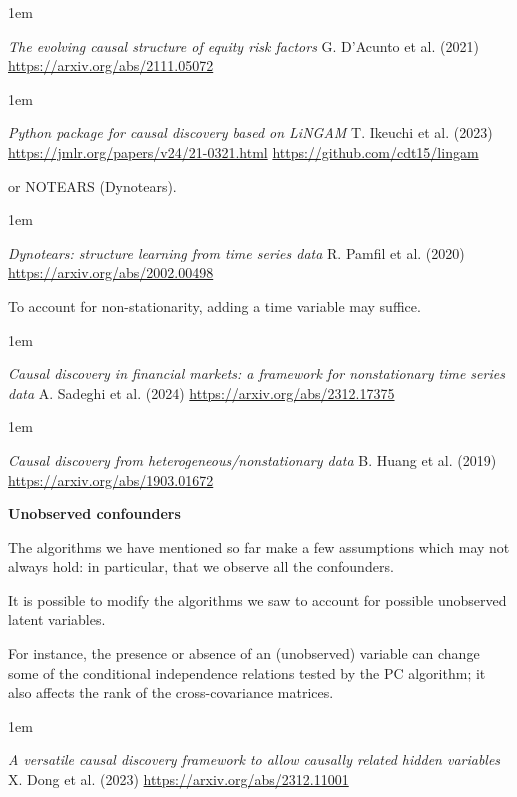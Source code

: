 \documentclass[a5paper]{article}
\newenvironment{reference}{%
  \medskip\goodbreak
  \parskip 0pt
  \raggedright
  \leftskip 1em
  \obeylines
}{\par\medskip\goodbreak}
\def\subsection#1{{\par\bigskip\goodbreak\large\bfseries #1\par}}
\begin{document}
\begin{reference}
  \emph{The evolving causal structure of equity risk factors}
  G. D'Acunto et al. (2021)
  \url{https://arxiv.org/abs/2111.05072}
\end{reference}

\begin{reference}
  \emph{Python package for causal discovery based on LiNGAM}
  T. Ikeuchi et al. (2023)
  \url{https://jmlr.org/papers/v24/21-0321.html}
  \url{https://github.com/cdt15/lingam}
\end{reference}

or NOTEARS (Dynotears).

\begin{reference}
  \emph{Dynotears: structure learning from time series data}
  R. Pamfil et al. (2020)
  \url{https://arxiv.org/abs/2002.00498}
\end{reference}

To account for non-stationarity, adding a time variable may suffice.

\begin{reference}
  \emph{Causal discovery in financial markets: a framework for nonstationary time series data}
  A. Sadeghi et al. (2024)
  \url{https://arxiv.org/abs/2312.17375}
\end{reference}

\begin{reference}
  \emph{Causal discovery from heterogeneous/nonstationary data}
  B. Huang et al. (2019)
  \url{https://arxiv.org/abs/1903.01672}
\end{reference}

\subsection{Unobserved confounders}

The algorithms we have mentioned so far make a few assumptions
which may not always hold: in particular,
that we observe all the confounders.

It is possible to modify the algorithms we saw
to account for possible unobserved latent variables.

For instance, the presence or absence of an (unobserved) variable
can change some of the conditional independence relations tested by the PC algorithm;
it also affects the rank of the cross-covariance matrices.

\begin{reference}
  \emph{A versatile causal discovery framework to allow causally related hidden variables}
  X. Dong et al. (2023)
  \url{https://arxiv.org/abs/2312.11001}
\end{reference}
\end{document}
